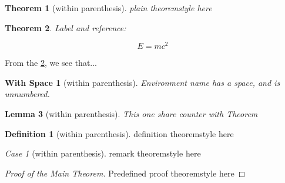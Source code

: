 \documentclass{memoir}
\begin{document}
\theoremstyle{plain}
\newtheorem{Theorem}{Theorem}[chapter]
\newtheorem*{With Space}{With Space}
\newtheorem{Lemma}[Theorem]{Lemma}

\theoremstyle{definition}
\newtheorem{Definition}{Definition}[chapter]

\theoremstyle{remark}
\newtheorem{Case}{Case}[chapter]

\begin{Theorem}[within parenthesis]
plain theoremstyle here
\end{Theorem}

\begin{Theorem}\label{simplestEquation}
Label and reference:

$$E=mc^2$$
\end{Theorem}

From the \ref{simplestEquation}, we see that...

\begin{With Space}[within parenthesis]
Environment name has a space, and is unnumbered.
\end{With Space}

\begin{Lemma}[within parenthesis]
This one share counter with Theorem
\end{Lemma}

\begin{Definition}[within parenthesis]
definition theoremstyle here
\end{Definition}

\begin{Case}[within parenthesis]
remark theoremstyle here
\end{Case}

\begin{proof}[Proof of the Main Theorem]
Predefined proof theoremstyle here
\end{proof}
\end{document}
